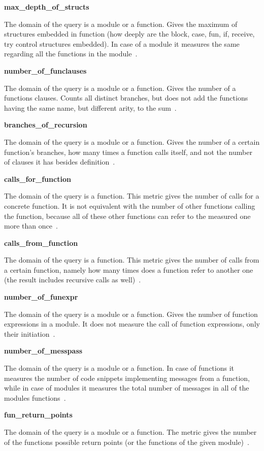 \textbf{max\_depth\_of\_structs}

The domain of the query is a module or a function. Gives the maximum of structures embedded in function (how deeply are the block, case, fun, if, receive, try control structures embedded). In case of a module it measures the same regarding all the functions in the module~\cite{refactorerl}.

\textbf{number\_of\_funclauses}

The domain of the query is a module or a function. Gives the number of a functions clauses. Counts all distinct branches, but does not add the functions having the same name, but different arity, to the sum~\cite{refactorerl}.

\textbf{branches\_of\_recursion}

The domain of the query is a module or a function. Gives the number of a certain function's branches, how many times a function calls itself, and not the number of clauses it has besides definition~\cite{refactorerl}.

\textbf{calls\_for\_function}

The domain of the query is a function. This metric gives the number of calls for a concrete function. It is not equivalent with the number of other functions calling the function, because all of these other functions can refer to the measured one more than once~\cite{refactorerl}.

\textbf{calls\_from\_function}

The domain of the query is a function. This metric gives the number of calls from a certain function, namely how many times does a function refer to another one (the result includes recursive calls as well)~\cite{refactorerl}.

\textbf{number\_of\_funexpr}

The domain of the query is a module or a function. Gives the number of function expressions in a module. It does not measure the call of function expressions, only their initiation~\cite{refactorerl}.

\textbf{number\_of\_messpass}

The domain of the query is a module or a function. In case of functions it measures the number of code snippets implementing messages from a function, while in case of modules it measures the total number of messages in all of the modules functions~\cite{refactorerl}.

\textbf{fun\_return\_points}

The domain of the query is a module or a function. The metric gives the number of the functions possible return points (or the functions of the given module)~\cite{refactorerl}.

